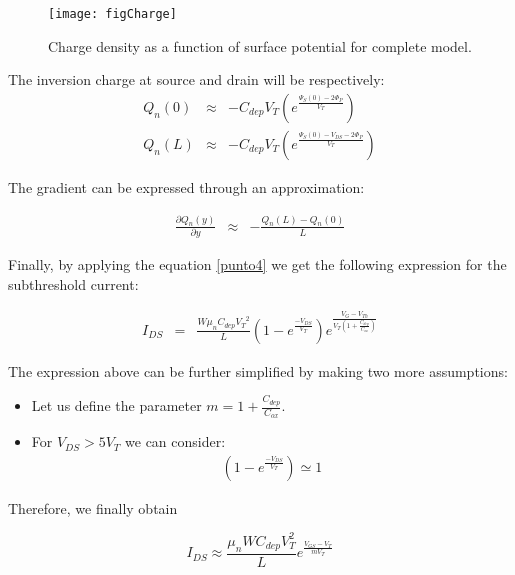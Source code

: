 \documentclass[a4paper, 12pt, twoside, openright]{report}
\begin{document}
	\begin{figure}[H]
	\centering
	\texttt{[image: figCharge]}
	\caption{Charge density as a function of surface potential for complete model.}
	\label{ChargeDist}
	\end{figure}

The inversion charge at source and drain will be respectively:
\begin{eqnarray*}
Q_n(0)&\approx&-C_{dep} V_T
\left(e^{\displaystyle \frac{\Psi_S(0)-2\Phi_P}{V_T}}
\right)\\[2ex]
Q_n(L)&\approx&-C_{dep} V_T
\left(e^{\displaystyle \frac{\Psi_S(0)- {V_{DS}}-2\Phi_P}{V_T}}
\right)
\end{eqnarray*}

The gradient can be expressed through an approximation:

\begin{eqnarray*}
\frac{\partial Q_n(y)}{\partial y} &\approx& - \frac{Q_n(L)-Q_n(0)}{L}
\end{eqnarray*}

Finally, by applying the equation \ref{punto4} we get the following expression for the subthreshold current:

\begin{eqnarray}
I_{DS}&=&\frac{W \mu_n C_{dep} {V_T}^2}{L}
         \left( 1-e^{\displaystyle\frac{-V_{DS}}{V_T}}\right) 
         e^{\displaystyle \frac{ {V_G-V_{Th}}}{V_T\left(1 +\frac{C_{dep}}{C_{ox}}\right)}} 
\end{eqnarray}

The expression above can be further simplified by making two more assumptions:

\begin{itemize}
\item Let us define the parameter $m=1+\frac{C_{dep}}{C_{ox}}$.
\item For $V_{DS}>5V_{T}$ we can consider:
\begin{eqnarray}
\left( 1-e^{\displaystyle\frac{-V_{DS}}{V_T}}\right) \simeq 1
\end{eqnarray}
\end{itemize} 

Therefore, we finally obtain

\begin{equation} \label{final_Ids}
I_{DS} \approx \frac{\mu_n W C_{dep} V_T^2}{L} e^{\frac{V_{GS} - V_T}{m V_T}}
\end{equation}
\end{document}
